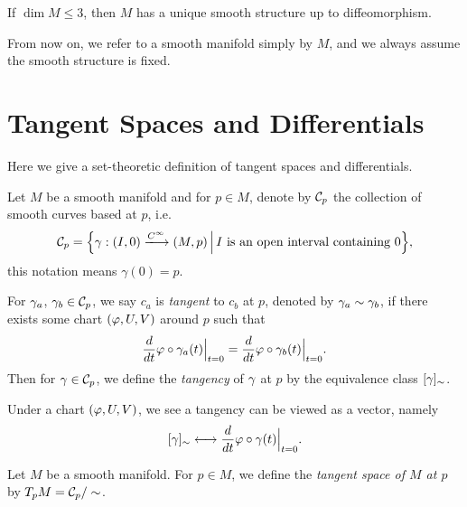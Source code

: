 \begin{proposition}
  If \(\dim M\leq 3\), then \(M\) has a unique smooth structure up to diffeomorphism.
\end{proposition}

From now on, we refer to a smooth manifold simply by \(M\), and we always assume the smooth structure is fixed.

\section{Tangent Spaces and Differentials}

Here we give a set-theoretic definition of tangent spaces and differentials.

\begin{definition}
  Let \(M\) be a smooth manifold and for \(p\in M\), denote by \(\cal{C}_p\) the collection of smooth curves based at \(p\), i.e. \[
    \cal{C}_p
    = \Big\{
      \gamma:(I,0)\xlongrightarrow{C^\infty} (M,p) \,\Big|\, I\text{ is an open interval containing }0
    \Big\},
  \]
  this notation means \(\gamma(0) = p\).
\end{definition}

\begin{definition}
  For \(\c_a\), \(\c_b\in\cal{C}_p\), we say \(c_a\) is \emph{tangent} to \(c_b\) at \(p\), denoted by \(\c_a\sim\c_b\), if there exists some chart \((\f,U,V)\) around \(p\) such that \[
    \frac{d}{dt} \f\circ\c_a(t)\Big|_{t=0}
    = \frac{d}{dt} \f\circ\c_b(t)\Big|_{t=0}.
  \]
  Then for \(\c\in\cal{C}_p\), we define the \emph{tangency} of \(\c\) at \(p\) by the equivalence class \([\c]_\sim\).
\end{definition}

Under a chart \((\f,U,V)\), we see a tangency can be viewed as a vector, namely \[
  [\c]_\sim \longleftrightarrow \frac{d}{dt}\f\circ\c(t)\Big|_{t=0}.
\]

\begin{definition}
  Let \(M\) be a smooth manifold. For \(p\in M\), we define the \emph{tangent space of \(M\) at \(p\)} by \(T_pM = \cal{C}_p/\sim\).
\end{definition}


